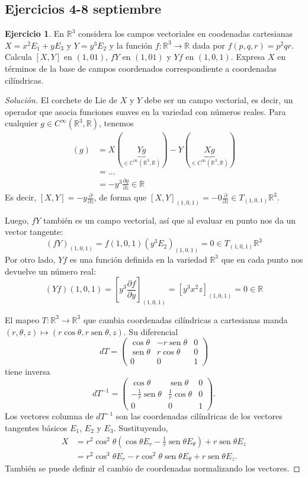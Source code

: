 \documentclass[spanish]{book}
\theoremstyle{definition}
\newtheorem*{ejer*}{Ejercicio}
\newcommand{\R}{\mathbb{R}}
\newcommand{\Cinf}{C^\infty}
\DeclareMathOperator{\sen}{sen}
\begin{document}
	\subsection{Ejercicios 4-8 septiembre}
	\begin{ejer*}
		En $\R^3$ considera los campos vectoriales en coodenadas cartesianas $X=x^2E_1+yE_3$ y $Y=y^3E_2$ y la función $f:\R^3\to\R$ dada por $f(p,q,r)=p^2qr$. Calcula $[X,Y]$ en $(1,01)$, $fY$ en $(1,01)$ y $Yf$ en $(1,0,1)$. Expresa $X$ en términos de la base de campos coordenados correspondiente a coordenadas cilíndricas.
	\end{ejer*}
	\begin{proof}[Solución]
		
		El corchete de Lie de $X$ y $Y$ debe ser un campo vectorial, es decir, un operador que asocia funciones suaves en la variedad con números reales. Para cualquier $g\in\Cinf(\R^3,\R)$, tenemos
		\begin{align*}
			[X,Y](g)&=X(\underbrace{Yg}_{\in\Cinf(\R^3,\R)})-Y(\underbrace{Xg}_{\in\Cinf(\R^3,\R)})\\
			&=\ldots\\
			&=-y^3\frac{\partial g}{\partial z}\in\R
		\end{align*}
		Es decir, $[X,Y]=-y\frac{\partial}{\partial z}$, de forma que $[X,Y]_{(1,0,1)}=-0\frac{\partial}{\partial z}\in T_{(1,0,1)}\R^3$.
		
		Luego, $fY$ también es un campo vectorial, así que al evaluar en punto nos da un vector tangente:
		\[(fY)_{(1,0,1)}=f(1,0,1)(y^3E_2)_{(1,0,1)}=0\in T_{(1,0,1)}\R^3\]
		Por otro lado, $Yf$ es una función definida en la variedad $\R^3$ que en cada punto nos devuelve un número real:
		\[(Yf)(1,0,1)=\left[y^3\frac{\partial f}{\partial y}\right]_{(1,0,1)}=[y^3x^2z]_{(1,0,1)}=0\in\R\]
		
		El mapeo $T:\R^3\to\R^3$ que cambia coordenadas cilíndricas a cartesianas manda $(r,\theta,z)\mapsto(r\cos\theta,r\sen\theta,z)$. Su diferencial
		\[dT=\begin{pmatrix}
			\cos\theta&-r\sen\theta&0\\
			\sen\theta&r\cos\theta&0\\
			0&0&1
		\end{pmatrix}\]
		tiene inversa
		\[dT^{-1}=\begin{pmatrix}
			\cos\theta&\sen\theta&0\\
			-\frac{1}{r}\sen\theta&\frac{1}{r}\cos\theta&0\\
			0&0&1
		\end{pmatrix}.\]
		Los vectores columna de $dT^{-1}$ son las coordenadas cilíndricas de los vectores tangentes básicos $E_1$, $E_2$ y $E_3$. Sustituyendo,
		\begin{align*}
			X&=r^2\cos^2\theta(\cos\theta E_r-\frac{1}{r}\sen\theta E_\theta)+r\sen\theta E_z\\
			&=r^2\cos^3\theta E_r-r\cos^2\theta\sen\theta E_\theta+r\sen\theta E_z.
		\end{align*}
		También se puede definir el cambio de coordenadas normalizando los vectores.
	\end{proof}
\end{document}
